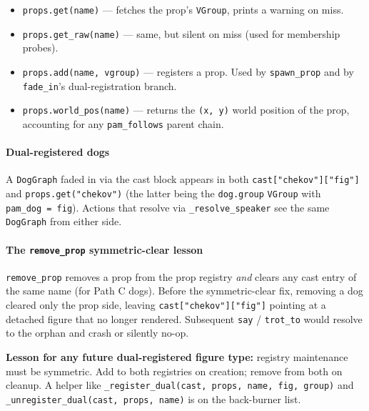 \documentclass[
  11pt,
]{book}
\providecommand{\tightlist}{%
  \setlength{\itemsep}{0pt}\setlength{\parskip}{0pt}}
\begin{document}
\begin{itemize}
\tightlist
\item
  \texttt{props.get(name)} --- fetches the prop's \texttt{VGroup},
  prints a warning on miss.
\item
  \texttt{props.get\_raw(name)} --- same, but silent on miss (used for
  membership probes).
\item
  \texttt{props.add(name,\ vgroup)} --- registers a prop. Used by
  \texttt{spawn\_prop} and by \texttt{fade\_in}'s dual-registration
  branch.
\item
  \texttt{props.world\_pos(name)} --- returns the \texttt{(x,\ y)} world
  position of the prop, accounting for any \texttt{pam\_follows} parent
  chain.
\end{itemize}

\paragraph{Dual-registered dogs}\label{dual-registered-dogs}

A \texttt{DogGraph} faded in via the cast block appears in both
\texttt{cast{[}"chekov"{]}{[}"fig"{]}} and \texttt{props.get("chekov")}
(the latter being the \texttt{dog.group} \texttt{VGroup} with
\texttt{pam\_dog\ =\ fig}). Actions that resolve via
\texttt{\_resolve\_speaker} see the same \texttt{DogGraph} from either
side.

\paragraph{\texorpdfstring{The \texttt{remove\_prop} symmetric-clear
lesson}{The remove\_prop symmetric-clear lesson}}\label{the-remove_prop-symmetric-clear-lesson}

\texttt{remove\_prop} removes a prop from the prop registry \emph{and}
clears any cast entry of the same name (for Path C dogs). Before the
symmetric-clear fix, removing a dog cleared only the prop side, leaving
\texttt{cast{[}"chekov"{]}{[}"fig"{]}} pointing at a detached figure
that no longer rendered. Subsequent \texttt{say} / \texttt{trot\_to}
would resolve to the orphan and crash or silently no-op.

\textbf{Lesson for any future dual-registered figure type:} registry
maintenance must be symmetric. Add to both registries on creation;
remove from both on cleanup. A helper like
\texttt{\_register\_dual(cast,\ props,\ name,\ fig,\ group)} and
\texttt{\_unregister\_dual(cast,\ props,\ name)} is on the back-burner
list.
\end{document}
